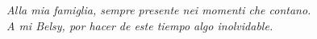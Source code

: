 \thispagestyle{empty}
\begin{flushright}
    \emph{Alla mia famiglia, sempre presente nei momenti che contano.\\ A mi Belsy, por hacer de este tiempo algo inolvidable.}
\end{flushright}

